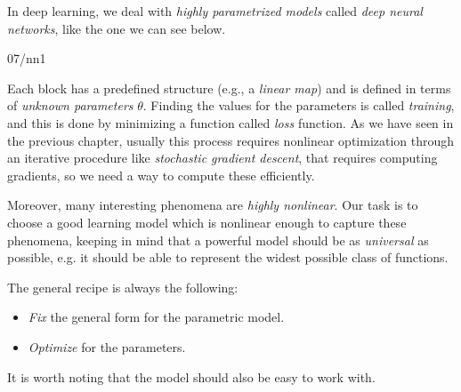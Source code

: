 
In deep learning, we deal with \emph{highly parametrized models} called \emph{deep neural networks}, like the one we can see below.

\begin{center}
		\begin{overpic}
		[trim=0cm 0cm 0cm 0cm,clip,width=0.99\linewidth]{07/nn1}
		\end{overpic}
\end{center}%

Each block has a predefined structure (e.g., a \emph{linear map}) and is defined in terms of \emph{unknown parameters} $\theta$. Finding the values for the parameters is called \emph{training}, and this is done by minimizing a function called \emph{loss} function. As we have seen in the previous chapter, usually this process requires nonlinear optimization through an iterative procedure like \emph{stochastic gradient descent}, that requires computing gradients, so we need a way to compute these efficiently.

Moreover, many interesting phenomena are \emph{highly nonlinear}. Our task is to choose a good learning model which is nonlinear enough to capture these phenomena, keeping in mind that a powerful model should be as \emph{universal} as possible, e.g. it should be able to represent the widest possible class of functions.

The general recipe is always the following:

\begin{itemize}
\item \emph{Fix} the general form for the parametric model.
\item \emph{Optimize} for the parameters.
\end{itemize}

It is worth noting that the model should also be easy to work with.
